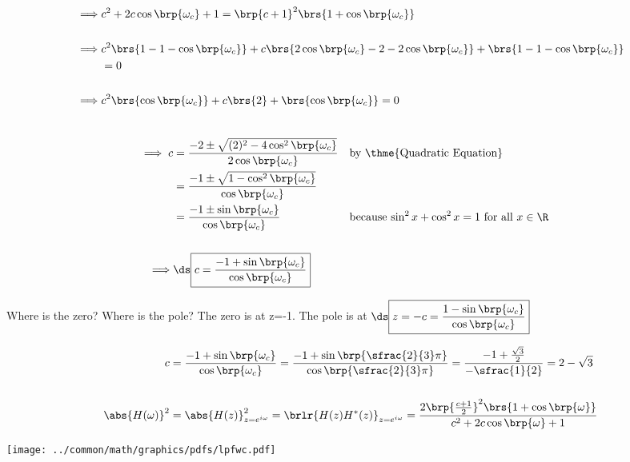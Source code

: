 {\begin{align*}
    \implies &c^2 + 2 c\cos\brp{\omega_c} + 1 
             = \brp{c+1}^2\brs{1 +  \cos\brp{\omega_c}}
  \\\\\implies & c^2\brs{1-1-\cos\brp{\omega_c}} 
             + c  \brs{2\cos\brp{\omega_c}-2-2\cos\brp{\omega_c}}
             +    \brs{1-1-\cos\brp{\omega_c}}
             \\&= 0
  \\\\\implies & c^2\brs{\cos\brp{\omega_c}} 
             + c  \brs{2}
             +    \brs{\cos\brp{\omega_c}}
             = 0
\end{align*}}



{\begin{align*}
  \\\implies c &= \frac{-2 \pm \sqrt{(2)^2 -4\cos^2\brp{\omega_c}}}
                       {2\cos\brp{\omega_c}}
               && \text{by \thme{Quadratic Equation}}
             \\&= \frac{-1 \pm \sqrt{1 -\cos^2\brp{\omega_c}}}
                       {\cos\brp{\omega_c}}
             \\&= \frac{-1 \pm \sin\brp{\omega_c}}
                       {\cos\brp{\omega_c}}
               && \text{because $\sin^2x + \cos^2x = 1$ for all $x\in\R$}
  \\
  \\\implies &\ds\boxed{c = \frac{-1 + \sin\brp{\omega_c}}
                    {\cos\brp{\omega_c}}}
\end{align*}}

Where is the zero? Where is the pole?
The zero is at z=-1. \qquad The pole is at 
$\ds\boxed{z=-c = \frac{1 - \sin\brp{\omega_c}}
                    {\cos\brp{\omega_c}}}$

\begin{example}[\exmd{1st order low-pass with corner frequency $\omega_c=\frac{2}{3}\pi$}]
{\begin{align*}
  c &= \frac{-1 + \sin\brp{\omega_c}}{\cos\brp{\omega_c}}
     = \frac{-1 + \sin\brp{\sfrac{2}{3}\pi}}{\cos\brp{\sfrac{2}{3}\pi}}
     = \frac{-1 + \frac{\sqrt{3}}{2}}{-\sfrac{1}{2}}
     = 2 - \sqrt{3}
  \\
  \\
  \abs{H(\omega)}^2
    &= \abs{H(z)}^2_{z=e^{i\omega}}
     = \brlr{H(z)H^\ast(z)}_{z=e^{i\omega}}
     = \frac{2\brp{\frac{c+1}{2}}^2\brs{1 +  \cos\brp{\omega}}}
            {c^2 + 2 c\cos\brp{\omega} + 1}
\end{align*}}

\texttt{[image: ../common/math/graphics/pdfs/lpfwc.pdf]}
\end{example}



